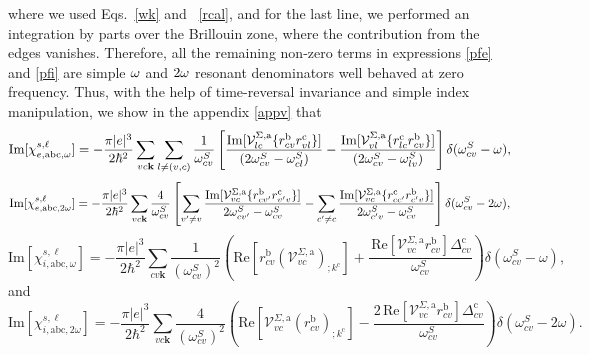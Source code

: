 \documentclass[floatfix,prb,aps,superscriptaddress,11pt,preprint]{revtex4}
\begin{document}
where we used Eqs.~\eqref{wk} and ~\eqref{rcal}, and for the last
line, we performed an
integration by parts over the Brillouin zone,
where the contribution from the edges vanishes.\cite{ashcroft_solid_1976}
Therefore, all the remaining non-zero terms in expressions \eqref{pfe}
and \eqref{pfi} 
are simple $\omega$ and $2\omega$ resonant denominators well behaved at zero
frequency. 
Thus, with the help of
time-reversal invariance and simple index manipulation, we show
in the appendix \ref{appv} that
\begin{equation}\label{calvimchiewn}
\mathrm{Im}[\chi_{e,\mathrm{a}\mathrm{b}\mathrm{c},\omega}^{s,\ell}] =
-\frac{\pi |e|^3}{2\hbar^2}\sum_{vc\mathbf{k}}\sum_{l\neq(v,c)}\frac{1}{\omega^{S}_{cv}}
\left[
\frac{\mathrm{Im}[\mathcal{V}^{\Sigma,\text{a}}_{lc}\{r^{\mathrm{b}}_{cv}r^{\mathrm{c}}_{vl}\}]}{(2\omega^S_{cv}-\omega^S_{cl})}
-\frac{\mathrm{Im}[\mathcal{V}^{\Sigma,\text{a}}_{vl}\{r^{\mathrm{c}}_{lc}r^{\mathrm{b}}_{cv}\}]}{(2\omega^S_{cv}-\omega^S_{lv})}
\right]\delta(\omega^S_{cv}-\omega),
\end{equation}  
\begin{equation}\label{calvimchie2wn}
\mathrm{Im}[\chi_{e,\mathrm{a}\mathrm{b}\mathrm{c},2\omega}^{s,\ell}] =
-\frac{\pi |e|^3}{2\hbar^2}\sum_{vc\mathbf{k}}\frac{4}{\omega^{S}_{cv}}
\left[
\sum_{v'\ne v}\frac{\mathrm{Im}[\mathcal{V}^{\Sigma,\text{a}}_{vc}\{r^{\mathrm{b}}_{cv'}r^{\mathrm{c}}_{v'v}\}]}{2\omega^S_{cv'}-\omega^S_{cv}}
- \sum_{c'\ne c}\frac{\mathrm{Im}[\mathcal{V}^{\Sigma,\text{a}}_{vc}\{r^{\mathrm{c}}_{cc'}r^{\mathrm{b}}_{c'v}\}]}{2\omega^S_{c'v}-\omega^S_{cv}}
\right]\delta(\omega^S_{cv}-2\omega),
\end{equation}
\begin{equation}\label{calvimchiwn}
\mathrm{Im}[\chi_{i,\text{a}\text{b}\text{c},\omega}^{s,\ell}]
= -\frac{\pi\vert e\vert^3}{2\hbar^2}\sum_{cv\mathbf{k}}\frac{1}{(\omega^{S}_{cv})^{2}}
\left(
\mathrm{Re}\left[r^{\text{b}}_{cv}\left(\mathcal{V}^{\Sigma,\text{a}}_{vc}\right)_{;k^{\text{c}}}\right]
+\frac{\,\mathrm{Re}\left[\mathcal{V}^{\Sigma,\text{a}}_{vc}r^{\text{b}}_{cv}\right]\Delta^{\text{c}}_{cv}}{\omega^{S}_{cv}} 
\right)\delta(\omega^{S}_{cv}-\omega),
\end{equation}
and
\begin{equation}\label{calvimchi2wn}
\mathrm{Im}[\chi_{i,\text{a}\text{b}\text{c},2\omega}^{s,\ell}] = -\frac{\pi \vert e\vert^{3}}{2\hbar^2}\sum_{vc\mathbf{k}}\frac{4}{(\omega^{S}_{cv})^{2}}\left(\mathrm{Re}\left[\mathcal{V}^{\Sigma,\text{a}}_{vc}\left(r^{\text{b}}_{cv}\right)_{;k^{\text{c}}}\right] - \frac{2\,\mathrm{Re}\left[\mathcal{V}^{\Sigma,\text{a}}_{vc}r^{\text{b}}_{cv}\right]\Delta^{\text{c}}_{cv}}{\omega^{S}_{cv}}\right)\delta(\omega^{S}_{cv}-2\omega).
\end{equation}
\end{document}
